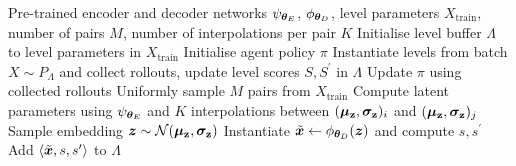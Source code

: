 \begin{algorithm}[!htb]
\centering
\caption{Data-regularised environment design}\label{c3:alg:DRED}
\begin{algorithmic}[1]
\Input Pre-trained encoder and decoder networks $\psi_{{\bm{\theta}}_E}$, $\phi_{{\bm{\theta}}_D}$, level parameters $X_\text{train}$, number of pairs $M$, number of interpolations per pair $K$
\State Initialise level buffer $\Lambda$ to level parameters in $X_\text{train}$ 
\State Initialise agent policy $\pi$
    \State Instantiate levels from batch $X \sim P_\Lambda$ and collect rollouts, update level scores $S, S^\prime$ in $\Lambda$
    \State Update $\pi$ using collected rollouts
    \State Uniformly sample $M$ pairs from $X_\text{train}$
        \State Compute latent parameters using $\psi_{{\bm{\theta}}_E}$ and $K$ interpolations between $({\bm{\mu}}_{\mathbf{z}}, {\bm{\sigma}}_{\mathbf{z}})_{i}$ and $({\bm{\mu}}_{\mathbf{z}}, {\bm{\sigma}}_{\mathbf{z}})_{j}$
            \State Sample embedding ${\bm{z}} \sim \mathcal{N}({\bm{\mu}}_{\mathbf{z}}, {\bm{\sigma}}_{\mathbf{z}})$
            \State Instantiate $\tilde{{\bm{x}}} \gets \phi_{{\bm{\theta}}_D}({\bm{z}})$ and compute $s, s^\prime$
            \State Add $\langle \tilde{{\bm{x}}}, s, s^\prime \rangle$ to $\Lambda$ %
        \EndFor
    \EndFor
\EndWhile
\end{algorithmic}
\end{algorithm}
%
